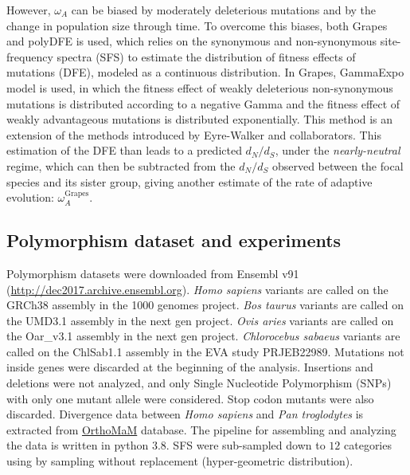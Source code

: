 \documentclass{article}
\newcommand{\dn}{d_N}
\newcommand{\ds}{d_S}
\newcommand{\dnds}{\dn / \ds}
\begin{document}
However, $\omega_A$ can be biased by moderately deleterious mutations\cite{eyre-walker_quantifying_2002} and by the change in population size through time\cite{eyre-walker_changing_2002}.
To overcome this biases, both Grapes\cite{galtier_adaptive_2016} and polyDFE\cite{tataru_polydfe_2020} is used, which relies on the synonymous and non-synonymous site-frequency spectra (SFS) to estimate the distribution of fitness effects of mutations (DFE), modeled as a continuous distribution.
In Grapes, GammaExpo model is used, in which the fitness effect of weakly deleterious non-synonymous mutations is distributed according to a negative Gamma and the fitness effect of weakly advantageous mutations is distributed exponentially.
This method is an extension of the methods introduced by Eyre-Walker and collaborators\cite{eyre-walker_distribution_2006, eyre-walker_estimating_2009}.
This estimation of the DFE than leads to a predicted $\dnds$, under the \textit{nearly-neutral} regime, which can then be subtracted from the $\dnds$ observed between the focal species and its sister group, giving another estimate of the rate of adaptive evolution: $\omega_A^{\text{Grapes}}$.

\subsection*{Polymorphism dataset and experiments}
Polymorphism datasets were downloaded from Ensembl v91 (\url{http://dec2017.archive.ensembl.org}).
\textit{Homo sapiens} variants are called on the GRCh38 assembly in the 1000 genomes project\cite{consortium_integrated_2012, the_1000_genomes_project_consortium_global_2015}.
\textit{Bos taurus} variants are called on the UMD3.1 assembly in the next gen project.
\textit{Ovis aries} variants are called on the Oar\_v3.1 assembly in the next gen project.
\textit{Chlorocebus sabaeus} variants are called on the ChlSab1.1 assembly in the EVA study PRJEB22989\cite{svardal_ancient_2017}.
Mutations not inside genes were discarded at the beginning of the analysis.
Insertions and deletions were not analyzed, and only Single Nucleotide Polymorphism (SNPs) with only one mutant allele were considered.
Stop codon mutants were also discarded.
Divergence data between \textit{Homo sapiens} and \textit{Pan troglodytes} is extracted from \href{http://www.orthomam.univ-montp2.fr}{OrthoMaM} database\cite{ranwez_orthomam_2007, douzery_orthomam_2014, scornavacca_orthomam_2019}.
The pipeline for assembling and analyzing the data is written in python 3.8.
SFS were sub-sampled down to $12$ categories using by sampling without replacement (hyper-geometric distribution).
\end{document}
